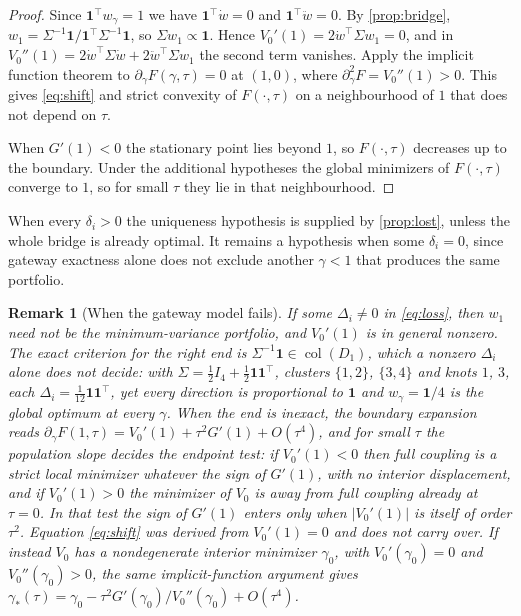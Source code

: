 \documentclass[11pt]{article}
\newcommand{\ones}{\mathbf{1}}
\newtheorem{remark}{Remark}
\begin{document}
\begin{proof}
Since $\ones^\top w_\gamma=1$ we have $\ones^\top\dot w=0$ and
$\ones^\top\ddot w=0$. By \cref{prop:bridge},
$w_1=\Sigma^{-1}\ones/\ones^\top\Sigma^{-1}\ones$, so
$\Sigma w_1\propto\ones$. Hence $V_0'(1)=2\dot w^\top\Sigma w_1=0$, and in
$V_0''(1)=2\dot w^\top\Sigma\dot w+2\ddot w^\top\Sigma w_1$ the second term
vanishes. Apply the implicit function theorem to
$\partial_\gamma F(\gamma,\tau)=0$ at $(1,0)$, where
$\partial_\gamma^2F=V_0''(1)>0$. This gives \eqref{eq:shift} and strict
convexity of $F(\cdot,\tau)$ on a neighbourhood of $1$ that does not depend
on $\tau$.

When $G'(1)<0$ the stationary point lies beyond $1$, so
$F(\cdot,\tau)$ decreases up to the boundary. Under the additional
hypotheses the global minimizers of $F(\cdot,\tau)$ converge to $1$, so for
small $\tau$ they lie in that neighbourhood.
\end{proof}

When every $\delta_i>0$ the uniqueness hypothesis is supplied by
\cref{prop:lost}, unless the whole bridge is already optimal. It remains a
hypothesis when some $\delta_i=0$, since gateway exactness alone does not
exclude another $\gamma<1$ that produces the same portfolio.

\begin{remark}[When the gateway model fails]
\label{rem:misspec}
If some $\Delta_i\neq0$ in \eqref{eq:loss}, then $w_1$ need not be the
minimum-variance portfolio, and $V_0'(1)$ is in general nonzero. The exact
criterion for the right end is $\Sigma^{-1}\ones\in\operatorname{col}(D_1)$,
which a nonzero $\Delta_i$ alone does not decide: with
$\Sigma=\tfrac12I_4+\tfrac12\ones\ones^\top$, clusters $\{1,2\}$, $\{3,4\}$
and knots $1$, $3$, each $\Delta_i=\tfrac1{12}\ones\ones^\top$, yet every
direction is proportional to $\ones$ and $w_\gamma=\ones/4$ is the global
optimum at every $\gamma$. When the end is inexact, the boundary expansion
reads $\partial_\gamma F(1,\tau)=V_0'(1)+\tau^2G'(1)+O(\tau^4)$, and for
small $\tau$ the population slope decides the endpoint test: if $V_0'(1)<0$
then full coupling is a strict local minimizer whatever the sign of
$G'(1)$, with no interior displacement, and if $V_0'(1)>0$ the minimizer of
$V_0$ is away from full coupling already at $\tau=0$. In that test the sign
of $G'(1)$ enters only when $|V_0'(1)|$ is itself of order $\tau^2$.
Equation \eqref{eq:shift} was derived from $V_0'(1)=0$ and does not carry
over. If instead $V_0$ has a nondegenerate interior minimizer $\gamma_0$,
with $V_0'(\gamma_0)=0$ and $V_0''(\gamma_0)>0$, the same implicit-function
argument gives
$\gamma_*(\tau)=\gamma_0-\tau^2G'(\gamma_0)/V_0''(\gamma_0)+O(\tau^4)$.
\end{remark}
\end{document}
